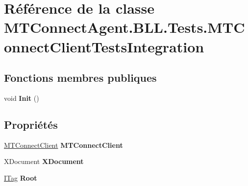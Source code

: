 \hypertarget{class_m_t_connect_agent_1_1_b_l_l_1_1_tests_1_1_m_t_connect_client_tests_integration}{}\section{Référence de la classe M\+T\+Connect\+Agent.\+B\+L\+L.\+Tests.\+M\+T\+Connect\+Client\+Tests\+Integration}
\label{class_m_t_connect_agent_1_1_b_l_l_1_1_tests_1_1_m_t_connect_client_tests_integration}
\subsection*{Fonctions membres publiques}
\begin{DoxyCompactItemize}
\item 
\mbox{\label{class_m_t_connect_agent_1_1_b_l_l_1_1_tests_1_1_m_t_connect_client_tests_integration_a5f0afb1a4e1a699320bcbc4f5949d37c}} 
void {\bfseries Init} ()
\end{DoxyCompactItemize}
\subsection*{Propriétés}
\begin{DoxyCompactItemize}
\item 
\mbox{\label{class_m_t_connect_agent_1_1_b_l_l_1_1_tests_1_1_m_t_connect_client_tests_integration_a6ff81a67a2d25bb2d74a8b64ddb17cdb}} 
\mbox{\hyperlink{class_m_t_connect_agent_1_1_b_l_l_1_1_m_t_connect_client}{M\+T\+Connect\+Client}} {\bfseries M\+T\+Connect\+Client}
\item 
\mbox{\label{class_m_t_connect_agent_1_1_b_l_l_1_1_tests_1_1_m_t_connect_client_tests_integration_a1557de18252e412acb63240b6cfe6de4}} 
X\+Document {\bfseries X\+Document}
\item 
\mbox{\label{class_m_t_connect_agent_1_1_b_l_l_1_1_tests_1_1_m_t_connect_client_tests_integration_a761a2ca9ed56072ac4edcbc21ae18983}} 
\mbox{\hyperlink{interface_m_t_connect_agent_1_1_model_1_1_i_tag}{I\+Tag}} {\bfseries Root}
\end{DoxyCompactItemize}

